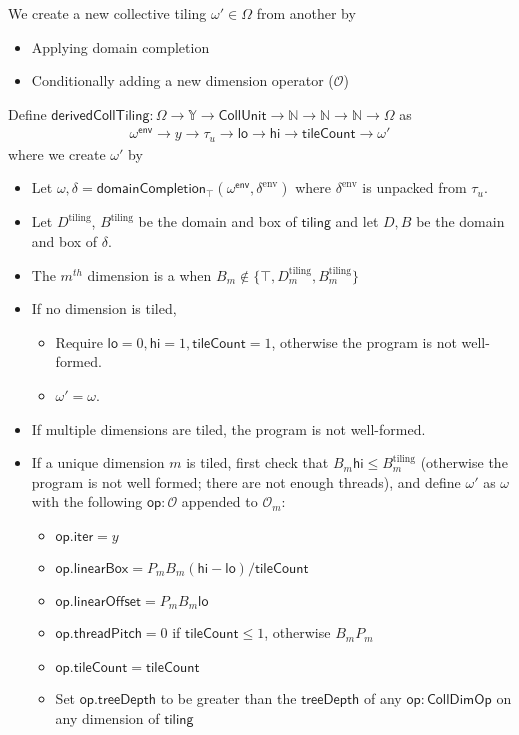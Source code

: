 We create a new collective tiling $\omega' \in \Omega$ from another by
\begin{itemize}
  \item Applying domain completion
  \filbreak
  \item Conditionally adding a new dimension operator ($\mathcal{O}$)
\end{itemize}
\filbreak
Define $\mathsf{derivedCollTiling}: \Omega \to \mathbb{Y} \to \mathsf{CollUnit} \to \mathbb{N} \to \mathbb{N} \to \mathbb{N} \to \Omega$ as
\begin{gather*}
  \mathsf{\omega^{env}} \to y \to \tau_u \to \mathsf{lo} \to \mathsf{hi} \to \mathsf{tileCount} \to \omega'
\end{gather*}
where we create $\omega'$ by
\filbreak
\begin{itemize}
  \item Let $\omega, \delta = \mathsf{domainCompletion_\top}(\mathsf{\omega^{env}}, \delta^\text{env})$ where $\delta^\text{env}$ is unpacked from $\tau_u$.
  \filbreak
  \item Let $D^\text{tiling}$, $B^\text{tiling}$ be the domain and box of $\mathsf{tiling}$ and let $D, B$ be the domain and box of $\delta$.
  \filbreak
  \item The $m^{th}$ dimension is a  when $B_m \notin \{ \top, D_m^\text{tiling}, B_m^\text{tiling} \}$
  \filbreak
  \item If no dimension is tiled,
  \begin{itemize}
    \item Require $\mathsf{lo}=0, \mathsf{hi}=1, \mathsf{tileCount} = 1$, otherwise the program is not well-formed.
    \item $\omega' = \omega$.
  \end{itemize}
  \filbreak
  \item If multiple dimensions are tiled, the program is not well-formed.
  \filbreak
  \item If a unique dimension $m$ is tiled, first check that $B_m \mathsf{hi} \le B_m^\text{tiling}$ (otherwise the program is not well formed; there are not enough threads), and define $\omega'$ as $\omega$ with the following $\mathsf{op}: \mathcal{O}$ appended to $\mathcal{O}_m$:
  \begin{itemize}
    \item $\mathsf{op.iter} = y$
    \filbreak
    \item $\mathsf{op.linearBox} = P_m B_m (\mathsf{hi} - \mathsf{lo}) / \mathsf{tileCount}$
    \filbreak
    \item $\mathsf{op.linearOffset} = P_m B_m \mathsf{lo}$
    \filbreak
    \item $\mathsf{op.threadPitch} = 0$ if $\mathsf{tileCount} \le 1$, otherwise $B_m P_m$
    \filbreak
    \item $\mathsf{op.tileCount} = \mathsf{tileCount}$
    \filbreak
    \item Set $\mathsf{op.treeDepth}$ to be greater than the $\mathsf{treeDepth}$ of any $\mathsf{op: CollDimOp}$ on any dimension of $\mathsf{tiling}$
  \end{itemize}
\end{itemize}
